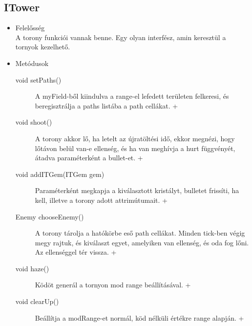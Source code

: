 \subsection{ITower}
\begin{itemize}
\item Felelősség\\
A torony funkciói vannak benne. Egy olyan interfész, amin keresztül a tornyok kezelhető.
\item Metódusok\\
	\begin{description}
		\item[void setPaths()] A myField-ből kiindulva a range-el lefedett területen felkeresi, és beregisztrálja a paths listába a path cellákat. +
\item[void shoot()] A torony akkor lő, ha letelt az újratöltési idő, ekkor megnézi, hogy lőtávon belül van-e ellenség, és ha van meghívja a hurt függvényét, átadva paraméterként a bullet-et. +
\item[void addITGem(ITGem gem)] Paraméterként megkapja a kiválasztott kristályt, bulletet frissíti, ha kell, illetve a torony adott attrimútumait. +
\item[Enemy chooseEnemy()] A torony tárolja a hatókörbe eső path cellákat. Minden tick-ben végig megy rajtuk, és kiválaszt egyet, amelyiken van ellenség, és oda fog lőni. Az ellenséggel tér vissza. +
\item[void haze()] Ködöt generál a tornyon mod range beállításával. +
\item[void clearUp()] Beállítja a modRange-et normál, köd nélküli értékre range alapján. +

		
		
	\end{description}
\end{itemize}
